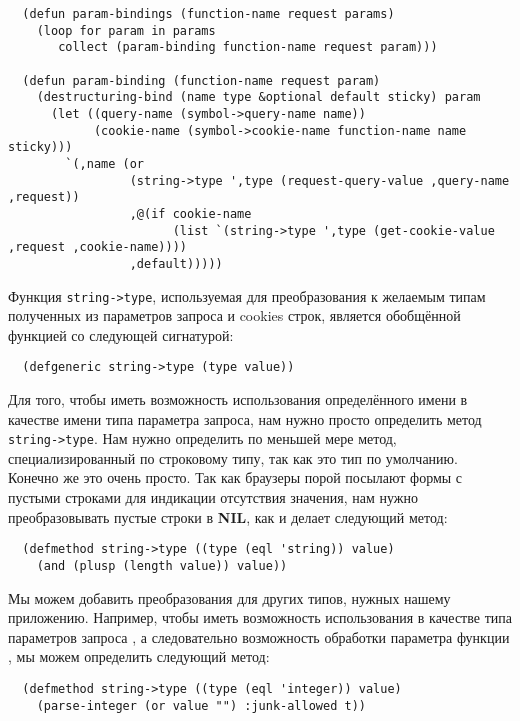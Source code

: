 \begin{lstlisting}
  (defun param-bindings (function-name request params)
    (loop for param in params
       collect (param-binding function-name request param)))

  (defun param-binding (function-name request param)
    (destructuring-bind (name type &optional default sticky) param
      (let ((query-name (symbol->query-name name))
            (cookie-name (symbol->cookie-name function-name name sticky)))
        `(,name (or 
                 (string->type ',type (request-query-value ,query-name ,request))
                 ,@(if cookie-name
                       (list `(string->type ',type (get-cookie-value ,request ,cookie-name))))
                 ,default)))))
\end{lstlisting}

Функция \lstinline!string->type!, используемая для преобразования к желаемым типам
полученных из параметров запроса и cookies строк, является обобщённой функцией со
следующей сигнатурой:

\begin{lstlisting}
  (defgeneric string->type (type value))
\end{lstlisting}

Для того, чтобы иметь возможность использования определённого имени в качестве имени типа
параметра запроса, нам нужно просто определить метод \lstinline!string->type!. Нам нужно
определить по меньшей мере метод, специализированный по строковому типу, так как это тип
по умолчанию. Конечно же это очень просто. Так как браузеры порой посылают формы с пустыми
строками для индикации отсутствия значения, нам нужно преобразовывать пустые строки в
\textbf{NIL}, как и делает следующий метод:

\begin{lstlisting}
  (defmethod string->type ((type (eql 'string)) value)
    (and (plusp (length value)) value))
\end{lstlisting}

Мы можем добавить преобразования для других типов, нужных нашему приложению. Например,
чтобы иметь возможность использования в качестве типа параметров запроса , а
следовательно возможность обработки параметра  функции , мы
можем определить следующий метод:

\begin{lstlisting}
  (defmethod string->type ((type (eql 'integer)) value)
    (parse-integer (or value "") :junk-allowed t))
\end{lstlisting}

